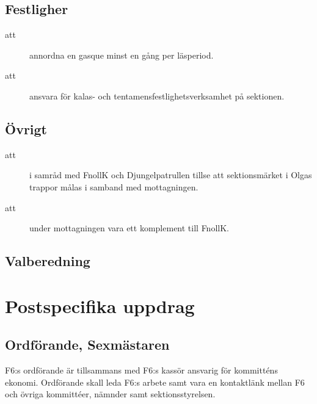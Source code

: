 \documentclass[a4paper]{article}
\begin{document}
\begin{foreningenv}{\forening{}}
    
    \subsection{Festligher}
    \begin{description}
        \item[att] annordna en gasque minst en gång per läsperiod.
        \item[att] ansvara för kalas- och tentamensfestlighetsverksamhet på sektionen.
    \end{description}
    
    \subsection{Övrigt}
    \begin{description}
        \item[att] i samråd med FnollK och Djungelpatrullen tillse att sektionsmärket i Olgas trappor målas i samband med mottagningen.
        \item[att] under mottagningen vara ett komplement till FnollK.
    \end{description}
    
    \subsection{Valberedning}
    \aliggvalber{}
    
    \section{Postspecifika uppdrag}
    \subsection{Ordförande, Sexmästaren}
    F6:s ordförande är tillsammans med F6:s kassör ansvarig för kommitténs ekonomi. Ordförande skall leda F6:s arbete samt vara en kontaktlänk mellan F6 och övriga kommittéer, nämnder samt sektionsstyrelsen. 
    

\end{foreningenv}
\end{document}
